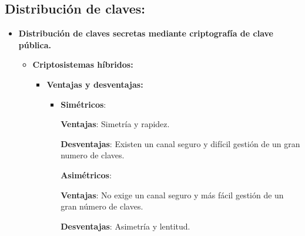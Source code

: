 \documentclass[12pt, twoside, openright]{report} %
\begin{document}
\subsection{Distribución de claves:}
\begin{itemize}
	\item \textbf{Distribución de claves secretas mediante criptografía de clave pública.}
	      \begin{itemize}
		      \item \textbf{Criptosistemas híbridos:}
		            \begin{itemize}
			            \item \textbf{Ventajas y desventajas:}
			                  \begin{itemize}
				                  \item \textbf{Simétricos}:

				                        \textbf{Ventajas}: Simetría y rapidez.

				                        \textbf{Desventajas}: Existen un canal seguro y difícil gestión de un gran numero de claves.

				                        \textbf{Asimétricos}:

				                        \textbf{Ventajas}: No exige un canal seguro y más fácil gestión de un gran número de claves.

				                        \textbf{Desventajas}: Asimetría y lentitud.


\end{itemize}
\end{itemize}
\end{itemize}
\end{itemize}
\end{document}
